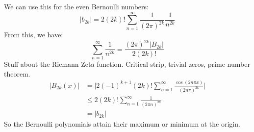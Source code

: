             We can use this for the even Bernoulli numbers:
            \begin{equation}
                |b_{2k}|=2(2k)!\sum_{n=1}^{\infty}
                    \frac{1}{(2\pi)^{2k}}\frac{1}{n^{2k}}
            \end{equation}
            From this, we have:
            \begin{equation}
                \sum_{n=1}^{\infty}\frac{1}{n^{2k}}
                =\frac{(2\pi)^{2k}|B_{2k}|}{2(2k)!}
            \end{equation}
            Stuff about the Riemann Zeta function. Critical strip,
            trivial zeros, prime number theorem.
            \begin{align}
                |B_{2k}(x)|&=
                    \Big|2(-1)^{k+1}(2k)!\sum_{n=1}^{\infty}
                    \frac{\cos(2n\pi{x})}{(2n\pi)^{2k}}\Big|\\
                    &\leq2(2k)!\sum_{n=1}^{\infty}\frac{1}{(2\pi{n})^{2k}}\\
                    &=|b_{2k}|
            \end{align}
            So the Bernoulli polynomials attain their maximum or minimum
            at the origin.
